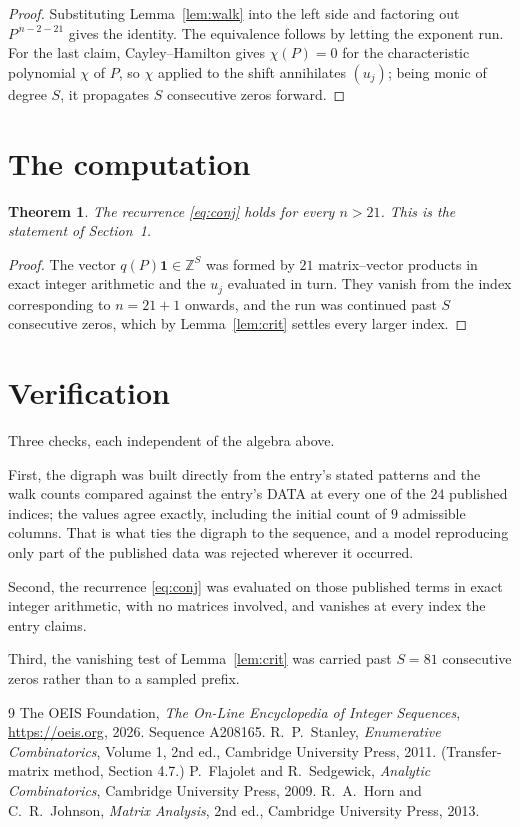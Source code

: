 \documentclass[11pt,a4paper]{article}
\theoremstyle{plain}
\newtheorem{theorem}{Theorem}
\theoremstyle{definition}
\begin{document}
\begin{proof}
Substituting Lemma~\ref{lem:walk} into the left side and factoring out
$P^{\,n-2-21}$ gives the identity. The equivalence follows by letting the exponent
run. For the last claim, Cayley--Hamilton gives $\chi(P)=0$ for the characteristic
polynomial $\chi$ of $P$, so $\chi$ applied to the shift annihilates $(u_j)$; being monic of
degree $S$, it propagates $S$ consecutive zeros forward.
\end{proof}

\section{The computation}

\begin{theorem}
The recurrence \eqref{eq:conj} holds for every $n>21$. This is the statement of
Section~1.
\end{theorem}

\begin{proof}
The vector $q(P)\mathbf{1}\in\mathbb{Z}^{S}$ was formed by $21$ matrix--vector
products in exact integer arithmetic and the $u_j$ evaluated in turn. They vanish from the
index corresponding to $n=21+1$ onwards, and the run was continued past $S$ consecutive
zeros, which by Lemma~\ref{lem:crit} settles every larger index.
\end{proof}

\section{Verification}

Three checks, each independent of the algebra above.

First, the digraph was built directly from the entry's stated patterns and the walk counts
compared against the entry's DATA at every one of the $24$ published indices; the
values agree exactly, including the initial count of $9$ admissible columns. That is
what ties the digraph to the sequence, and a model reproducing only part of the published
data was rejected wherever it occurred.

Second, the recurrence \eqref{eq:conj} was evaluated on those published terms in exact
integer arithmetic, with no matrices involved, and vanishes at every index the entry claims.

Third, the vanishing test of Lemma~\ref{lem:crit} was carried past $S=81$ consecutive
zeros rather than to a sampled prefix.

\begin{thebibliography}{9}
 The OEIS Foundation, \emph{The On-Line Encyclopedia of Integer
Sequences}, \url{https://oeis.org}, 2026. Sequence A208165.
 R.~P.~Stanley, \emph{Enumerative Combinatorics}, Volume 1, 2nd ed.,
Cambridge University Press, 2011. (Transfer-matrix method, Section 4.7.)
 P.~Flajolet and R.~Sedgewick, \emph{Analytic Combinatorics}, Cambridge
University Press, 2009.
 R.~A.~Horn and C.~R.~Johnson, \emph{Matrix Analysis}, 2nd ed., Cambridge
University Press, 2013.
\end{thebibliography}
\end{document}
